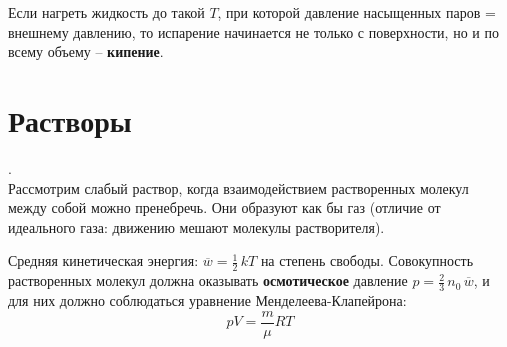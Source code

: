 Если нагреть жидкость до такой $T$, при которой давление насыщенных паров = внешнему давлению, то испарение начинается не только с по\-верх\-но\-сти, но и по всему объему -- {\bf кипение}.\\

\section{Растворы}.\\

Рассмотрим слабый раствор, когда взаимодействием растворенных молекул между собой можно пренебречь. Они образуют как бы газ (отличие от идеального газа: движению мешают молекулы растворителя).

 Средняя кинетическая энергия: $\overline{w}=\frac12\,kT$ на степень свободы.
 Сово\-куп\-ность растворенных молекул должна оказывать {\bf осмотическое} да\-в\-ле\-ние $p=\frac23\,n_0\,\overline{w}$, и для них должно соблюдаться уравнение Менделеева-Кла\-пейрона:
 \begin{displaymath}
  pV=\frac m\mu RT
 \end{displaymath}

